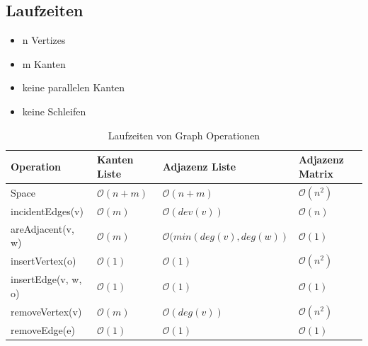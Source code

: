 \subsection{Laufzeiten}
\begin{itemize}
	\item n Vertizes
	\item m Kanten
	\item keine parallelen Kanten
	\item keine Schleifen
\end{itemize}
\begin{table}[h]
	\centering
	\begin{tabu} to \linewidth {l l l l}
		\toprule
		Operation & Kanten Liste & Adjazenz Liste & Adjazenz Matrix\\
		\midrule
		Space & $\mathcal{O}(n+m)$ & $\mathcal{O}(n+m)$ & $\mathcal{O}(n^2)$   \\
		incidentEdges(v) & $\mathcal{O}(m)$ & $\mathcal{O}(dev(v))$ & $\mathcal{O}(n)$   \\
		areAdjacent(v, w) & $\mathcal{O}(m)$ & $\mathcal{O}(min(deg(v), deg(w))$ & $\mathcal{O}(1)$   \\
		insertVertex(o) & $\mathcal{O}(1)$ & $\mathcal{O}(1)$ & $\mathcal{O}(n^2)$   \\
		insertEdge(v, w, o) & $\mathcal{O}(1)$ & $\mathcal{O}(1)$ & $\mathcal{O}(1)$   \\
		removeVertex(v) & $\mathcal{O}(m)$ & $\mathcal{O}(deg(v))$ & $\mathcal{O}(n^2)$   \\
		removeEdge(e) & $\mathcal{O}(1)$ & $\mathcal{O}(1)$ & $\mathcal{O}(1)$   \\
		\bottomrule
	\end{tabu}
	\caption{Laufzeiten von Graph Operationen}
\end{table}

